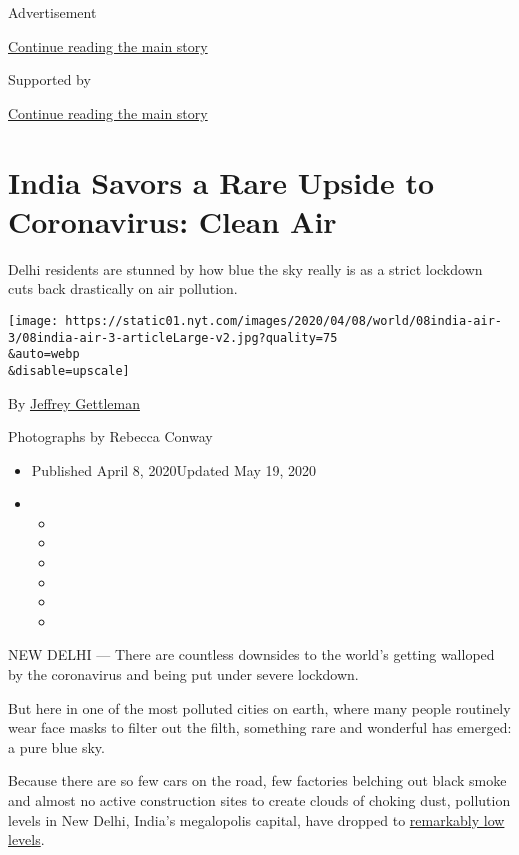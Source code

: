 Advertisement

\protect\hyperlink{after-top}{Continue reading the main story}

Supported by

\protect\hyperlink{after-sponsor}{Continue reading the main story}

\hypertarget{india-savors-a-rare-upside-to-coronavirus-clean-air}{%
\section{India Savors a Rare Upside to Coronavirus: Clean
Air}\label{india-savors-a-rare-upside-to-coronavirus-clean-air}}

Delhi residents are stunned by how blue the sky really is as a strict
lockdown cuts back drastically on air pollution.

\texttt{[image: https://static01.nyt.com/images/2020/04/08/world/08india-air-3/08india-air-3-articleLarge-v2.jpg?quality=75\\\&auto=webp\\\&disable=upscale]}

By \href{https://www.nytimes.com/by/jeffrey-gettleman}{Jeffrey
Gettleman}

Photographs by Rebecca Conway

\begin{itemize}
\item
  Published April 8, 2020Updated May 19, 2020
\item
  \begin{itemize}
  \item
  \item
  \item
  \item
  \item
  \item
  \end{itemize}
\end{itemize}

NEW DELHI --- There are countless downsides to the world's getting
walloped by the coronavirus and being put under severe lockdown.

But here in one of the most polluted cities on earth, where many people
routinely wear face masks to filter out the filth, something rare and
wonderful has emerged: a pure blue sky.

Because there are so few cars on the road, few factories belching out
black smoke and almost no active construction sites to create clouds of
choking dust, pollution levels in New Delhi, India's megalopolis
capital, have dropped to
\href{https://www.cpcb.nic.in/air/NCR/jantacurfew.pdf}{remarkably low
levels}.

